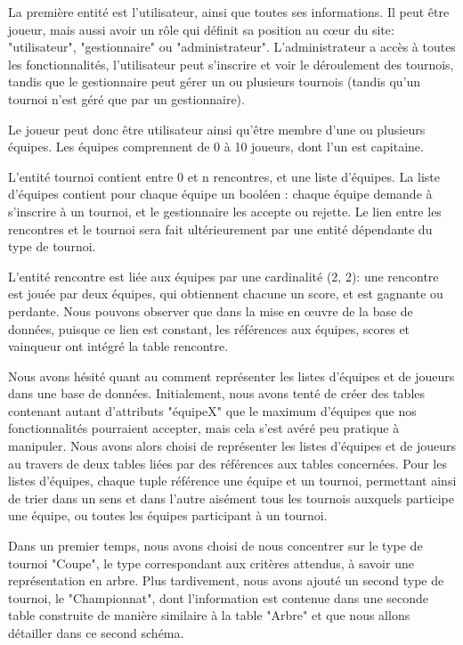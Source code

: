 \documentclass[12pt]{report}
\begin{document}
        \par
        La première entité est l'utilisateur, ainsi que toutes ses informations. Il peut être joueur, mais aussi avoir un rôle qui définit sa position au cœur du site: "utilisateur", "gestionnaire" ou "administrateur". L'administrateur a accès à toutes les fonctionnalités, l'utilisateur peut s'inscrire et voir le déroulement des tournois, tandis que le gestionnaire peut gérer un ou plusieurs tournois (tandis qu'un tournoi n'est géré que par un gestionnaire).
        \par
	    Le joueur peut donc être utilisateur ainsi qu'être membre d'une ou plusieurs équipes. Les équipes comprennent de 0 à 10 joueurs, dont l'un est capitaine. 
	    \par
	    L'entité tournoi contient entre 0 et n rencontres, et une liste d'équipes. La liste d'équipes contient pour chaque équipe un booléen : chaque équipe demande à s'inscrire à un tournoi, et le gestionnaire les accepte ou rejette. Le lien entre les rencontres et le tournoi sera fait ultérieurement par une entité dépendante du type de tournoi.
	    \par
	    L'entité rencontre est liée aux équipes par une cardinalité (2, 2): une rencontre est jouée par deux équipes, qui obtiennent chacune un score, et est gagnante ou perdante. Nous pouvons observer que dans la mise en œuvre de la base de données, puisque ce lien est constant, les références aux équipes, scores et vainqueur ont intégré la table rencontre. 
	    \par
	    Nous avons hésité quant au comment représenter les listes d'équipes et de joueurs dans une base de données. Initialement, nous avons tenté de créer des tables contenant autant d'attributs "équipeX" que le maximum d'équipes que nos fonctionnalités pourraient accepter, mais cela s'est avéré peu pratique à manipuler. Nous avons alors choisi de représenter les listes d'équipes et de joueurs au travers de deux tables liées par des références aux tables concernées. Pour les listes d'équipes, chaque tuple référence une équipe et un tournoi, permettant ainsi de trier dans un sens et dans l'autre aisément tous les tournois auxquels participe une équipe, ou toutes les équipes participant à un tournoi. 
	    \par
	    Dans un premier temps, nous avons choisi de nous concentrer sur le type de tournoi "Coupe", le type correspondant aux critères attendus, à savoir une représentation en arbre. Plus tardivement, nous avons ajouté un second type de tournoi, le "Championnat", dont l'information est contenue dans une seconde table construite de manière similaire à la table "Arbre" et que nous allons détailler dans ce second schéma. 
        
\end{document}
